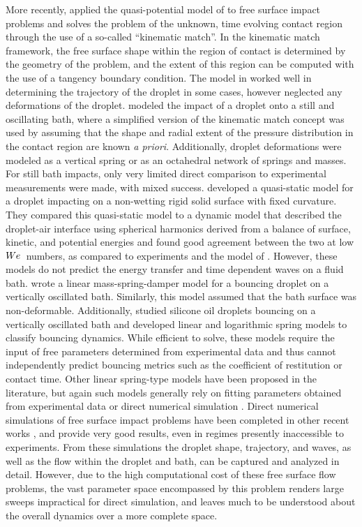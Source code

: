 \documentclass{jfm}
\begin{document}
\hspace*{1em} More recently, \cite{galeano2017non,galeano2019quasi,galeano2021capillary} applied the quasi-potential model of \cite{dias2008theory} to free surface impact problems and solves the problem of the unknown, time evolving contact region through the use of a so-called ``kinematic match''. In the kinematic match framework, the free surface shape within the region of contact is determined by the geometry of the problem, and the extent of this region can be computed with the use of a tangency boundary condition. The model in \cite{galeano2017non} worked well in determining the trajectory of the droplet in some cases, however neglected any deformations of the droplet. \cite{blanchette2016modeling,blanchette2017octahedra} modeled the impact of a droplet onto a still and oscillating bath, where a simplified version of the kinematic match concept was used by assuming that the shape and radial extent of the pressure distribution in the contact region are known {\it a priori}. Additionally, droplet deformations were modeled as a vertical spring or as an octahedral network of springs and masses. For still bath impacts, only very limited direct comparison to experimental measurements were made, with mixed success. \cite{molavcek2012quasi} developed a quasi-static model for a droplet impacting on a non-wetting rigid solid surface with fixed curvature. They compared this quasi-static model to a dynamic model that described the droplet-air interface using spherical harmonics derived from a balance of surface, kinetic, and potential energies and found good agreement between the two at low $W\kern-0.03em e\,$ numbers, as compared to experiments and the model of \cite{okumura2003water}. However, these models do not predict the energy transfer and time dependent waves on a fluid bath. \cite{terwagne2013role} wrote a linear mass-spring-damper model for a bouncing droplet on a vertically oscillated bath. Similarly, this model assumed that the bath surface was non-deformable. Additionally, \cite{molavcek2013drops} studied silicone oil droplets bouncing on a vertically oscillated bath and developed linear and logarithmic spring models to classify bouncing dynamics. While efficient to solve, these models require the input of free parameters determined from experimental data and thus cannot independently predict bouncing metrics such as the coefficient of restitution or contact time.  Other linear spring-type models have been proposed in the literature, but again such models generally rely on fitting parameters obtained from experimental data or direct numerical simulation \cite{sanjay2022drop}.  Direct numerical simulations of free surface impact problems have been completed in other recent works \citep{pan2007dynamics,he2015fluid,sharma2020energetics,fudge2021dipping}, and provide very good results, even in regimes presently inaccessible to experiments. From these simulations the droplet shape, trajectory, and waves, as well as the flow within the droplet and bath, can be captured and analyzed in detail. However, due to the high computational cost of these free surface flow problems, the vast parameter space encompassed by this problem renders large sweeps impractical for direct simulation, and leaves much to be understood about the overall dynamics over a more complete space. \\ 
\end{document}
